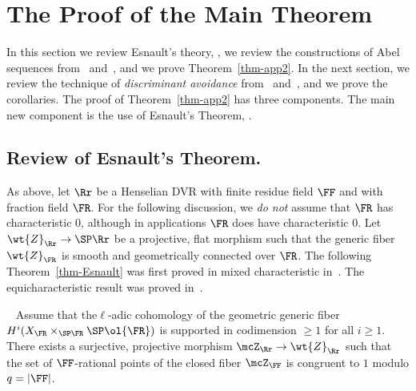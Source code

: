 \section{The Proof of the Main Theorem}\label{sec-proof}

In this section we review Esnault's theory, \cite{Esnaultpadic}, we review the constructions of Abel sequences from~\cite{dJHS} and~\cite{Zhu}, and we prove Theorem~\ref{thm-app2}. In the next section, we review the technique of \emph{discriminant avoidance} from~\cite{dJS8} and~\cite[Section~16]{dJHS}, and we prove the corollaries. The proof of Theorem~\ref{thm-app2} has three components. The main new component is the use of Esnault's Theorem, \cite[Corollary~1.2]{Esnaultpadic}.

\subsection{Review of Esnault's Theorem.} \label{subsec-rev}
As above, let $\Rr$ be a Henselian DVR with finite residue field $\FF$ and with fraction field $\FR$. For the following discussion, we \emph{do not} assume that $\FR$ has characteristic $0$, although in applications $\FR$ does have characteristic $0$. Let $\wt{Z}_\Rr \to \SP \Rr$ be a projective, flat morphism such that the generic fiber $\wt{Z}_\FR$ is smooth and geometrically connected over $\FR$. The following Theorem~\ref{thm-Esnault} was first proved in mixed characteristic in~\cite{Esnaultpadic}. The equicharacteristic result was proved in~\cite{EsnaultXu}.

\begin{theo}
{\cite[Theorem~1.1]{Esnaultpadic}~\cite[Theorem~1.1]{EsnaultXu}}\label{thm-Esnault}
Assume that the\linebreak$\ell$-adic cohomology of the geometric generic fiber $H^i(X_\FR \times_{\SP \FR} \SP \ol{\FR})$ is supported in codimension $\geq 1$ for all $i\geq 1$. There exists a surjective, projective morphism $\mcZ_\Rr \to \wt{Z}_\Rr$ such that the set of $\FF$-rational points of the closed fiber $\mcZ_\FF$ is congruent to $1$ modulo $q=|\FF|$.
\end{theo}

